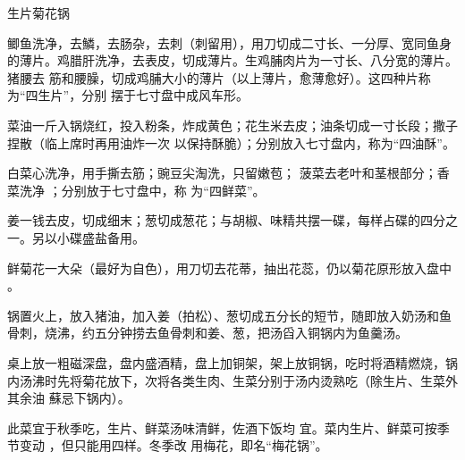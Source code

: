 \begin{recipe}{生片菊花锅}

\ingredients


\cooking

\step 鲫鱼洗净，去鱗，去肠杂，去刺（刺留用），用刀切成二寸长、一分厚、宽同鱼身
的薄片。鸡腊肝洗净，去表皮，切成薄片。生鸡脯肉片为一寸长、八分宽的薄片。猪腰去
筋和腰臊，切成鸡脯大小的薄片（以上薄片，愈薄愈好）。这四种片称为“四生片”，分别
摆于七寸盘中成风车形。

\step 菜油一斤入锅烧红，投入粉条，炸成黄色；花生米去皮；油条切成一寸长段；撒子
捏散（临上席时再用油炸一次 以保持酥脆）；分别放入七寸盘内，称为“四油酥”。

白菜心洗净，用手撕去筋；豌豆尖淘洗，只留嫩苞； 菠菜去老叶和茎根部分；香菜洗净
；分别放于七寸盘中，称 为“四鲜菜”。

\step 姜一钱去皮，切成细末；葱切成葱花；与胡椒、味精共摆一碟，每样占碟的四分之
一。另以小碟盛盐备用。

\step 鲜菊花一大朵（最好为自色），用刀切去花蒂，抽出花蕊，仍以菊花原形放入盘中
。

\step 锅置火上，放入猪油，加入姜（拍松）、葱切成五分长的短节，随即放入奶汤和鱼
骨刺，烧沸，约五分钟捞去鱼骨刺和姜、葱，把汤舀入铜锅内为鱼羹汤。

\step 桌上放一粗磁深盘，盘内盛酒精，盘上加铜架，架上放铜锅，吃时将酒精燃烧，锅
内汤沸时先将菊花放下，次将各类生肉、生菜分别于汤内烫熟吃（除生片、生菜外其余油
蘇忌下锅内）。

\notes

此菜宜于秋季吃，生片、鲜菜汤味清鲜，佐酒下饭均 宜。菜内生片、鲜菜可按季节变动
，但只能用四样。冬季改 用梅花，即名“梅花锅”。

\end{recipe}

